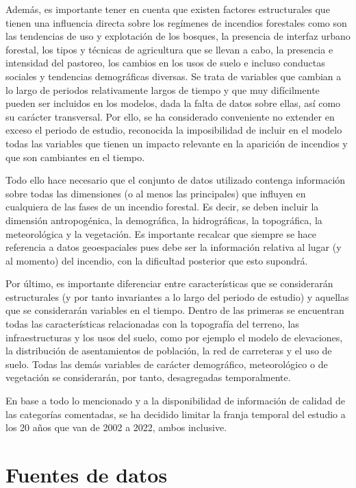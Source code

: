 \documentclass[12pt,a4paper,]{book}
\numberwithin{dummy}{section}
\theoremstyle{ocrenumbox}
\theoremstyle{blacknumex}
\theoremstyle{blacknumbox}
\theoremstyle{ocrenum}
\theoremstyle{ocrenum}
\begin{document}
Además, es importante tener en cuenta que existen factores estructurales
que tienen una influencia directa sobre los regímenes de incendios
forestales como son las tendencias de uso y explotación de los bosques,
la presencia de interfaz urbano forestal, los tipos y técnicas de
agricultura que se llevan a cabo, la presencia e intensidad del
pastoreo, los cambios en los usos de suelo e incluso conductas sociales
y tendencias demográficas diversas. Se trata de variables que cambian a
lo largo de periodos relativamente largos de tiempo y que muy
difícilmente pueden ser incluidos en los modelos, dada la falta de datos
sobre ellas, así como su carácter transversal. Por ello, se ha
considerado conveniente no extender en exceso el periodo de estudio,
reconocida la imposibilidad de incluir en el modelo todas las variables
que tienen un impacto relevante en la aparición de incendios y que son
cambiantes en el tiempo.

Todo ello hace necesario que el conjunto de datos utilizado contenga
información sobre todas las dimensiones (o al menos las principales) que
influyen en cualquiera de las fases de un incendio forestal. Es decir,
se deben incluir la dimensión antropogénica, la demográfica, la
hidrográficas, la topográfica, la meteorológica y la vegetación. Es
importante recalcar que siempre se hace referencia a datos geoespaciales
pues debe ser la información relativa al lugar (y al momento) del
incendio, con la dificultad posterior que esto supondrá.

Por último, es importante diferenciar entre características que se
considerarán estructurales (y por tanto invariantes a lo largo del
periodo de estudio) y aquellas que se considerarán variables en el
tiempo. Dentro de las primeras se encuentran todas las características
relacionadas con la topografía del terreno, las infraestructuras y los
usos del suelo, como por ejemplo el modelo de elevaciones, la
distribución de asentamientos de población, la red de carreteras y el
uso de suelo. Todas las demás variables de carácter demográfico,
meteorológico o de vegetación se considerarán, por tanto, desagregadas
temporalmente.

En base a todo lo mencionado y a la disponibilidad de información de
calidad de las categorías comentadas, se ha decidido limitar la franja
temporal del estudio a los 20 años que van de 2002 a 2022, ambos
inclusive.

\hypertarget{fuentes-de-datos}{%
\section{Fuentes de datos}\label{fuentes-de-datos}}
\end{document}
